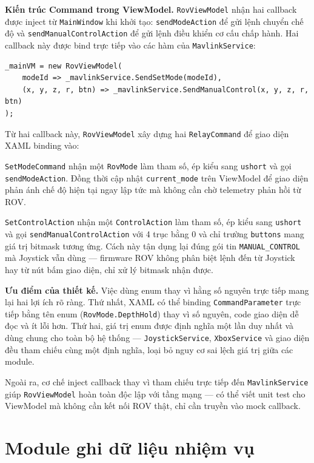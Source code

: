\documentclass[../DoAn.tex]{subfiles}
\begin{document}
\textbf{Kiến trúc Command trong ViewModel.}
\texttt{RovViewModel} nhận hai callback được inject từ
\texttt{MainWindow} khi khởi tạo: \texttt{sendModeAction} để gửi
lệnh chuyển chế độ và \texttt{sendManualControlAction} để gửi lệnh
điều khiển cơ cấu chấp hành. Hai callback này được bind trực tiếp
vào các hàm của \texttt{MavlinkService}:

\begin{lstlisting}[language=Csharp, caption={Inject callback vào RovViewModel từ MainWindow}, label={lst:viewmodel_inject}]
_mainVM = new RovViewModel(
    modeId => _mavlinkService.SendSetMode(modeId),
    (x, y, z, r, btn) => _mavlinkService.SendManualControl(x, y, z, r, btn)
);
\end{lstlisting}

Từ hai callback này, \texttt{RovViewModel} xây dựng hai
\texttt{RelayCommand} để giao diện XAML binding vào:

\texttt{SetModeCommand} nhận một \texttt{RovMode} làm tham số, ép
kiểu sang \texttt{ushort} và gọi \texttt{sendModeAction}. Đồng thời
cập nhật \texttt{current\_mode} trên ViewModel để giao diện phản ánh
chế độ hiện tại ngay lập tức mà không cần chờ telemetry phản hồi từ
ROV.

\texttt{SetControlAction} nhận một \texttt{ControlAction} làm tham
số, ép kiểu sang \texttt{ushort} và gọi
\texttt{sendManualControlAction} với 4 trục bằng 0 và chỉ trường
\texttt{buttons} mang giá trị bitmask tương ứng. Cách này tận dụng
lại đúng gói tin \texttt{MANUAL\_CONTROL} mà Joystick vẫn dùng ---
firmware ROV không phân biệt lệnh đến từ Joystick hay từ nút bấm
giao diện, chỉ xử lý bitmask nhận được.

\textbf{Ưu điểm của thiết kế.}
Việc dùng enum thay vì hằng số nguyên trực tiếp mang lại hai lợi ích
rõ ràng. Thứ nhất, XAML có thể binding \texttt{CommandParameter}
trực tiếp bằng tên enum (\texttt{RovMode.DepthHold}) thay vì số
nguyên, code giao diện dễ đọc và ít lỗi hơn. Thứ hai, giá trị enum
được định nghĩa một lần duy nhất và dùng chung cho toàn bộ hệ thống
--- \texttt{JoystickService}, \texttt{XboxService} và giao diện đều
tham chiếu cùng một định nghĩa, loại bỏ nguy cơ sai lệch giá trị
giữa các module.

Ngoài ra, cơ chế inject callback thay vì tham chiếu trực tiếp đến
\texttt{MavlinkService} giúp \texttt{RovViewModel} hoàn toàn độc lập
với tầng mạng --- có thể viết unit test cho ViewModel mà không cần
kết nối ROV thật, chỉ cần truyền vào mock callback.

\section{Module ghi dữ liệu nhiệm vụ}
\label{section:mission_recording}
\end{document}
